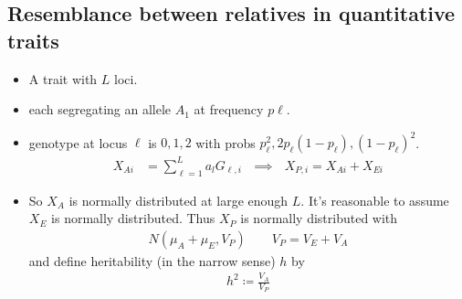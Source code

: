 \documentclass{article}
\newcommand{\qiq}{\ \ \ \implies\ \ \ }
\begin{document}
        \subsection{Resemblance between relatives in quantitative traits}
            \begin{itemize}
                \item A trait with $L$ loci.
                \item each segregating an allele $A_1$ at frequency $p\ell$.
                \item genotype at locus $\ell$ is $0,1,2$ with probs $p_\ell^2, 2p_\ell(1 - p_\ell),(1 - p_\ell)^2$.
                \begin{align*}
                    X_{Ai} &= \displaystyle\sum_{\ell=1}^La_lG_{\ell,i} \qiq X_{P,i} = X_{Ai} + X_{Ei}
                \end{align*}
                \item So $X_A$ is normally distributed at large enough $L$.  It's reasonable to assume $X_E$ is normally distributed.  Thus $X_P$ is normally distributed with
                \begin{align*}
                    N(\mu_A + \mu_E,V_P) \qquad V_P = V_E + V_A
                \end{align*}
                and define heritability (in the narrow sense) $h$ by
                \begin{align*}
                    h^2 \coloneqq \frac{V_A}{V_P}
                \end{align*}
            \end{itemize}
\end{document}
